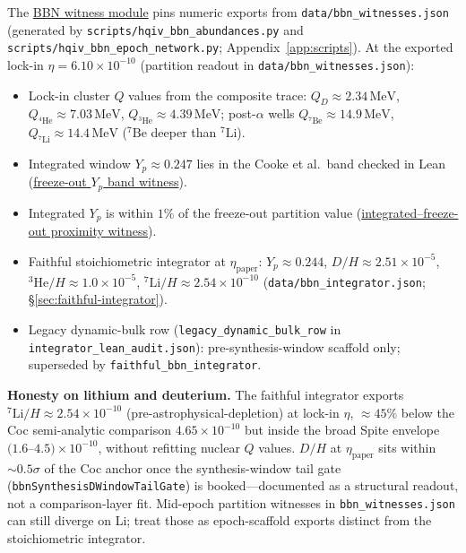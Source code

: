 \documentclass[11pt]{amsart}
\newcommand{\leanid}[1]{\nolinkurl{#1}}
\begin{document}
The \hyperref[lean:bbn-witness]{BBN witness module} pins numeric exports
from \texttt{data/bbn\_witnesses.json} (generated by
\texttt{scripts/hqiv\_bbn\_abundances.py} and
\texttt{scripts/hqiv\_bbn\_epoch\_network.py}; Appendix~\ref{app:scripts}).
At the exported lock-in $\eta=6.10\times 10^{-10}$ (partition readout in
\texttt{data/bbn\_witnesses.json}):

\begin{itemize}[leftmargin=2em]
\item Lock-in cluster $Q$ values from the composite trace:
  $Q_D\approx 2.34\,\mathrm{MeV}$, $Q_{^4\mathrm{He}}\approx 7.03\,\mathrm{MeV}$,
  $Q_{^3\mathrm{He}}\approx 4.39\,\mathrm{MeV}$; post-$\alpha$ wells
  $Q_{^7\mathrm{Be}}\approx 14.9\,\mathrm{MeV}$,
  $Q_{^7\mathrm{Li}}\approx 14.4\,\mathrm{MeV}$ ($^7\mathrm{Be}$ deeper than $^7\mathrm{Li}$).
\item Integrated window $Y_p\approx 0.247$ lies in the Cooke et al.\ band
  checked in Lean (\hyperref[lean:bbn-yp-band]{freeze-out $Y_p$ band witness}).
\item Integrated $Y_p$ is within $1\%$ of the freeze-out partition value
  (\hyperref[lean:bbn-yp-near-freeze]{integrated--freeze-out proximity
  witness}).
\item Faithful stoichiometric integrator at $\eta_{\mathrm{paper}}$:
  $Y_p\approx 0.244$, $D/H\approx 2.51\times 10^{-5}$,
  $^3\mathrm{He}/H\approx 1.0\times 10^{-5}$,
  $^7\mathrm{Li}/H\approx 2.54\times 10^{-10}$
  (\texttt{data/bbn\_integrator.json}; \S\ref{sec:faithful-integrator}).
\item Legacy dynamic-bulk row (\texttt{legacy\_dynamic\_bulk\_row} in
  \texttt{integrator\_lean\_audit.json}): pre-synthesis-window scaffold only;
  superseded by \texttt{faithful\_bbn\_integrator}.
\end{itemize}

\textbf{Honesty on lithium and deuterium.}
The faithful integrator exports $^7\mathrm{Li}/H\approx 2.54\times 10^{-10}$
(pre-astrophysical-depletion) at lock-in $\eta$, $\approx 45\%$ below the Coc
semi-analytic comparison $4.65\times 10^{-10}$ but inside the broad Spite
envelope $(1.6$--$4.5)\times 10^{-10}$, without refitting nuclear $Q$ values.
$D/H$ at
$\eta_{\mathrm{paper}}$ sits within $\sim 0.5\sigma$ of the Coc anchor once
the synthesis-window tail gate (\leanid{bbnSynthesisDWindowTailGate}) is
booked---documented as a structural readout, not a comparison-layer fit.
Mid-epoch partition witnesses in
\texttt{bbn\_witnesses.json} can still diverge on Li; treat those as
epoch-scaffold exports distinct from the stoichiometric integrator.
\end{document}
